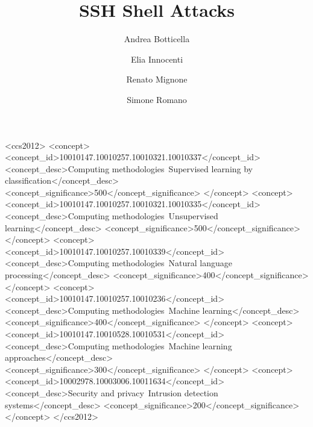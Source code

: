 \documentclass[acmlarge]{template/column-format-template/acmart}
\begin{document}
\title{SSH Shell Attacks}


\author{Andrea Botticella}

\author{Elia Innocenti}
\authornotemark[1]

\author{Renato Mignone}
\authornotemark[1]

\author{Simone Romano}
\authornotemark[1]

\renewcommand{\shortauthors}{Botticella, Innocenti, Mignone, and Romano}

\begin{CCSXML}
<ccs2012>
   <concept>
       <concept_id>10010147.10010257.10010321.10010337</concept_id>
       <concept_desc>Computing methodologies~Supervised learning by classification</concept_desc>
       <concept_significance>500</concept_significance>
   </concept>
   <concept>
       <concept_id>10010147.10010257.10010321.10010335</concept_id>
       <concept_desc>Computing methodologies~Unsupervised learning</concept_desc>
       <concept_significance>500</concept_significance>
   </concept>
   <concept>
       <concept_id>10010147.10010257.10010339</concept_id>
       <concept_desc>Computing methodologies~Natural language processing</concept_desc>
       <concept_significance>400</concept_significance>
   </concept>
   <concept>
       <concept_id>10010147.10010257.10010236</concept_id>
       <concept_desc>Computing methodologies~Machine learning</concept_desc>
       <concept_significance>400</concept_significance>
   </concept>
   <concept>
       <concept_id>10010147.10010528.10010531</concept_id>
       <concept_desc>Computing methodologies~Machine learning approaches</concept_desc>
       <concept_significance>300</concept_significance>
   </concept>
   <concept>
       <concept_id>10002978.10003006.10011634</concept_id>
       <concept_desc>Security and privacy~Intrusion detection systems</concept_desc>
       <concept_significance>200</concept_significance>
   </concept>
</ccs2012>
\end{CCSXML}
\end{document}
